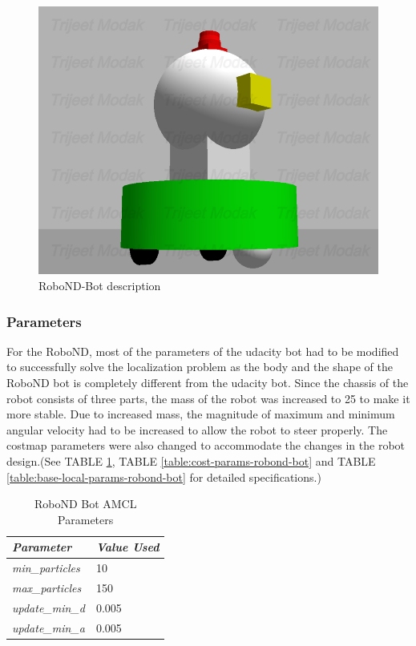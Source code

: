 \documentclass[10pt,journal,compsoc]{IEEEtran}
\begin{document}
\begin{figure}[h]
    \centering
    \includegraphics[scale=0.225]{imgs/robond-bot.png}
    \centering
    \caption{RoboND-Bot description}
    \label{fig:robond-bot}
\end{figure}


\subsubsection{Parameters}
For the RoboND, most of the parameters of the udacity bot had to be modified to successfully solve the localization problem as the body and the shape of the RoboND bot is completely different from the udacity bot. Since the chassis of the robot consists of three parts, the mass of the robot was increased to 25 to make it more stable. Due to increased mass, the magnitude of maximum and minimum angular velocity had to be increased to allow the robot to steer properly. The costmap parameters were also changed to accommodate the changes in the robot design.(See TABLE \ref{table:amcl-params-robond-bot}, TABLE \ref{table:cost-params-robond-bot} and TABLE \ref{table:base-local-params-robond-bot} for detailed specifications.)
\begin{table}[h]
\renewcommand{\arraystretch}{1.5}
\centering
\begin{tabular}{|l|l|}
\hline
\textit{\textbf{Parameter}} & \textit{\textbf{Value Used}} \\ \hline
\textit{min\_particles}     & 10                           \\ \hline
\textit{max\_particles}     & 150                          \\ \hline
\textit{update\_min\_d}     & 0.005                        \\ \hline
\textit{update\_min\_a}     & 0.005                        \\ \hline
\end{tabular}
\vspace{5pt}
\caption{RoboND Bot AMCL Parameters}
\label{table:amcl-params-robond-bot}
\end{table}
\end{document}

